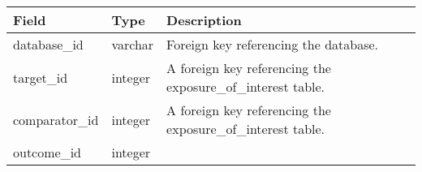 \documentclass[
]{article}
\begin{document}
\begin{longtable}[]{@{}lll@{}}
\toprule
\begin{minipage}[b]{0.23\columnwidth}\raggedright
Field\strut
\end{minipage} & \begin{minipage}[b]{0.18\columnwidth}\raggedright
Type\strut
\end{minipage} & \begin{minipage}[b]{0.50\columnwidth}\raggedright
Description\strut
\end{minipage}\tabularnewline
\midrule
\endhead
\begin{minipage}[t]{0.23\columnwidth}\raggedright
database\_id\strut
\end{minipage} & \begin{minipage}[t]{0.18\columnwidth}\raggedright
varchar\strut
\end{minipage} & \begin{minipage}[t]{0.50\columnwidth}\raggedright
Foreign key referencing the database.\strut
\end{minipage}\tabularnewline
\begin{minipage}[t]{0.23\columnwidth}\raggedright
target\_id\strut
\end{minipage} & \begin{minipage}[t]{0.18\columnwidth}\raggedright
integer\strut
\end{minipage} & \begin{minipage}[t]{0.50\columnwidth}\raggedright
A foreign key referencing the exposure\_of\_interest table.\strut
\end{minipage}\tabularnewline
\begin{minipage}[t]{0.23\columnwidth}\raggedright
comparator\_id\strut
\end{minipage} & \begin{minipage}[t]{0.18\columnwidth}\raggedright
integer\strut
\end{minipage} & \begin{minipage}[t]{0.50\columnwidth}\raggedright
A foreign key referencing the exposure\_of\_interest table.\strut
\end{minipage}\tabularnewline
\begin{minipage}[t]{0.23\columnwidth}\raggedright
outcome\_id\strut
\end{minipage} & \begin{minipage}[t]{0.18\columnwidth}\raggedright
integer\strut
\end{minipage} & \begin{minipage}[t]{0.50\columnwidth}\raggedright

\end{minipage}
\end{longtable}
\end{document}
